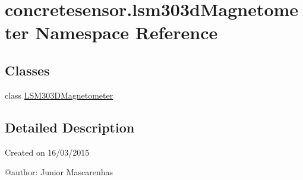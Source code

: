 \hypertarget{namespaceconcretesensor_1_1lsm303dMagnetometer}{}\section{concretesensor.\+lsm303d\+Magnetometer Namespace Reference}
\label{namespaceconcretesensor_1_1lsm303dMagnetometer}
\subsection*{Classes}
\begin{DoxyCompactItemize}
\item 
class \hyperlink{classconcretesensor_1_1lsm303dMagnetometer_1_1LSM303DMagnetometer}{L\+S\+M303\+D\+Magnetometer}
\end{DoxyCompactItemize}


\subsection{Detailed Description}
\begin{DoxyVerb}Created on 16/03/2015

@author: Junior Mascarenhas
\end{DoxyVerb}
 